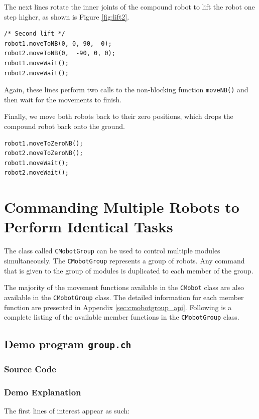 \documentclass{article}
\begin{document}
The next lines rotate the inner joints of the compound robot to lift the robot
one step higher, as shown is Figure \ref{fig:lift2}.
\begin{verbatim}
/* Second lift */
robot1.moveToNB(0, 0, 90,  0);
robot2.moveToNB(0,  -90, 0, 0);
robot1.moveWait();
robot2.moveWait();
\end{verbatim}
Again, these lines perform two calls to the non-blocking function
\texttt{moveNB()} and then wait for the movements to finish.

Finally, we move both robots back to their zero positions, which drops 
the compound robot back onto the ground.
\begin{verbatim}
robot1.moveToZeroNB();
robot2.moveToZeroNB();
robot1.moveWait();
robot2.moveWait();
\end{verbatim}

\section{Commanding Multiple Robots to Perform Identical Tasks}
The class called \texttt{CMobotGroup} can be used
to control multiple modules simultaneously. The \texttt{CMobotGroup} represents
a group of robots. Any command that is given to the group of modules is 
duplicated to each member of the group.

The majority of the movement functions available in the \texttt{CMobot} class
are also available in the \texttt{CMobotGroup} class. 
The detailed information for each member function are presented in 
Appendix \ref{sec:cmobotgroup_api}.
 Following
is a complete listing of the available member functions in the \texttt{CMobotGroup}
class.

\vspace{8pt}
\noindent


\noindent


\subsection{Demo program \texttt{group.ch}}
\subsubsection{Source Code}


\subsubsection{Demo Explanation}
The first lines of interest appear as such:
\end{document}
